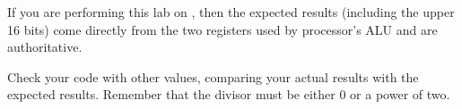If you are performing this lab on \runtimeenvironment, then the expected results (including the upper 16 bits) come directly from the two registers used by processor's ALU and are authoritative.

Check your code with other values, comparing your actual results with the expected results.
Remember that the divisor must be either 0 or a power of two.
